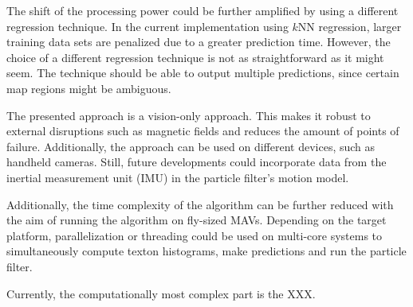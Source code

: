 The shift of the processing power could be further amplified by using
a different regression technique. In the current implementation using
$k$NN regression, larger training data sets are penalized due to a
greater prediction time. However, the choice of a different regression
technique is not as straightforward as it might seem. The technique
should be able to output multiple predictions, since certain map
regions might be ambiguous.

The presented approach is a vision-only approach. This makes it robust to external disruptions such as magnetic fields and reduces the amount of points of failure. Additionally, the approach can be used on different devices, such as handheld cameras. Still, future developments could incorporate data from the inertial measurement unit (IMU) in the
particle filter’s motion model.

Additionally, the time complexity of the algorithm can be further reduced with the aim of running the algorithm on
fly-sized MAVs. Depending on the target platform, parallelization or threading could be used on multi-core systems to simultaneously compute texton histograms, make predictions and run the particle filter.     

Currently, the computationally most complex part is the XXX.

